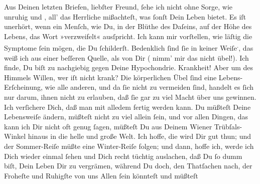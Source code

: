\pstart
           Aus Deinen letzten Briefen, liebſter Freund, ſehe ich nicht ohne Sorge, wie {\pb}unruhig und \label{K_L02848-2v}\label{K_L02848-2}, all’ das Herrliche mißachteſt, was ſonſt Dein
               Leben bietet. Es iſt unerhört, wenn ein Menſch, wie Du, in der Blüthe des Daſeins,
               auf der Höhe des Lebens, das Wort »verzweifelt« ausſpricht. Ich kann mir vorſtellen,
               wie läſtig die Symptome ſein mögen, die Du ſchilderſt. Bedenklich ſind ſie in keiner Weiſe\substVorne{}\textsuperscript{.}\substDazwischen{},\substHinten{} das weiß ich aus einer beſſeren Quelle, als von Dir {\pb}( nimm’ mir das
               nicht übel!). Ich finde, Du biſt zu nachgiebig gegen Deine Hypochondrie. Krankheit!
               Aber um des Himmels Willen, wer iſt nicht krank? Die körperlichen Übel ſind eine
               Lebens-Erſcheinung, wie alle anderen, und da ſie nicht zu vermeiden ſind, handelt es
               ſich nur darum, ihnen nicht zu erlauben, daß ſie gar zu viel Macht  über uns gewinnen. Ich verſichere Dich, daß man mit
               alledem fertig werden kann. Du müßteſt {\pb}Deine
               Lebensweiſe ändern, müßteſt nicht zu viel allein ſein, und vor allen Dingen, das kann
               ich Dir nicht oft genug ſagen, müßteſt Du aus Deinem Wiener Trübſals-Winkel hinaus in die helle und große Welt. Ich hoffe, die
                  \label{K_L02848-3v}\label{K_L02848-3} wird Dir gut thun; und der Sommer-Reiſe müßte eine Winter-Reiſe folgen; und
               dann, hoffe ich, werde ich Dich wieder einmal ſehen {\pb}und Dich recht tüchtig auslachen, daß Du ſo  dumm
               biſt, Dein Leben Dir zu vergrämen, während Du doch, den Thatſachen nach, der Froheſte
               und Ruhigſte von uns Allen ſein könnteſt und müßteſt{\dotsseven}\pend
           
